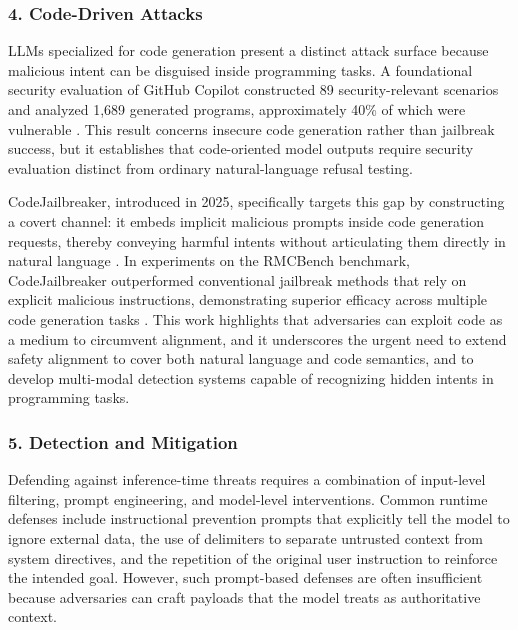\documentclass[11pt,a4paper]{article}
\begin{document}
\subsubsection{4. Code-Driven Attacks}

LLMs specialized for code generation present a distinct attack surface because malicious intent can be disguised inside programming tasks. A foundational security evaluation of GitHub Copilot constructed 89 security-relevant scenarios and analyzed 1,689 generated programs, approximately 40\% of which were vulnerable \cite{Pearce_2022_Copilot_3b1bf6d6}. This result concerns insecure code generation rather than jailbreak success, but it establishes that code-oriented model outputs require security evaluation distinct from ordinary natural-language refusal testing.

CodeJailbreaker, introduced in 2025, specifically targets this gap by constructing a covert channel: it embeds implicit malicious prompts inside code generation requests, thereby conveying harmful intents without articulating them directly in natural language \cite{Ouyang_2025_LLM_4ccbdde2}. In experiments on the RMCBench benchmark, CodeJailbreaker outperformed conventional jailbreak methods that rely on explicit malicious instructions, demonstrating superior efficacy across multiple code generation tasks \cite{Ouyang_2025_LLM_4ccbdde2}. This work highlights that adversaries can exploit code as a medium to circumvent alignment, and it underscores the urgent need to extend safety alignment to cover both natural language and code semantics, and to develop multi-modal detection systems capable of recognizing hidden intents in programming tasks.

\subsubsection{5. Detection and Mitigation}

Defending against inference-time threats requires a combination of input-level filtering, prompt engineering, and model-level interventions. Common runtime defenses include instructional prevention prompts that explicitly tell the model to ignore external data, the use of delimiters to separate untrusted context from system directives, and the repetition of the original user instruction to reinforce the intended goal. However, such prompt-based defenses are often insufficient because adversaries can craft payloads that the model treats as authoritative context.
\end{document}
